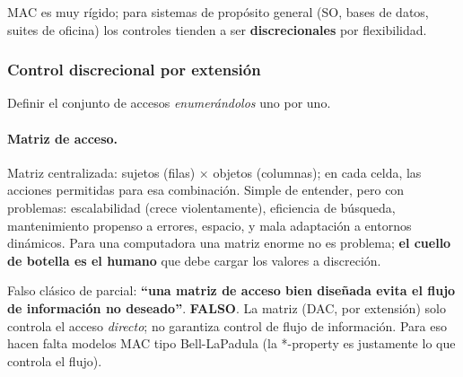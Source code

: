 \documentclass[../main.tex]{subfiles}
\begin{document}
MAC es muy rígido; para sistemas de propósito general (SO, bases de datos, suites de oficina) los controles tienden a ser \textbf{discrecionales} por flexibilidad.

\subsubsection{Control discrecional por extensión}

Definir el conjunto de accesos \emph{enumerándolos} uno por uno.

\paragraph{Matriz de acceso.} Matriz centralizada: sujetos (filas) $\times$ objetos (columnas); en cada celda, las acciones permitidas para esa combinación. Simple de entender, pero con problemas: escalabilidad (crece violentamente), eficiencia de búsqueda, mantenimiento propenso a errores, espacio, y mala adaptación a entornos dinámicos. Para una computadora una matriz enorme no es problema; \textbf{el cuello de botella es el humano} que debe cargar los valores a discreción.

\begin{ojo}
Falso clásico de parcial: \textbf{``una matriz de acceso bien diseñada evita el flujo de información no deseado''}. \textbf{FALSO}. La matriz (DAC, por extensión) solo controla el acceso \emph{directo}; no garantiza control de flujo de información. Para eso hacen falta modelos MAC tipo Bell-LaPadula (la *-property es justamente lo que controla el flujo).
\end{ojo}

\begin{center}
\end{center}
\end{document}
